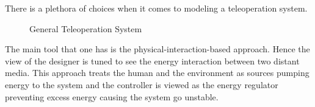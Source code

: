 There is a plethora of choices when it comes to modeling a teleoperation system. 


\begin{figure}%
\centering
{}
\caption{General Teleoperation System}%
\label{fig:teleop}%
\end{figure}

The main tool that one has is the physical-interaction-based approach. Hence the view of the designer is tuned to see the energy interaction between two distant media. This approach treats the human and the environment as sources pumping energy to the system and the controller is viewed as the energy regulator preventing excess energy causing the system go unstable. 